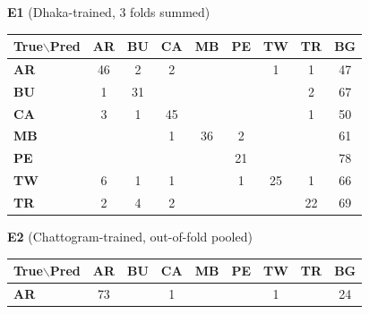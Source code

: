 \begin{table}[t]
\centering
\begin{minipage}{0.48\linewidth}
\centering
\scriptsize
\textbf{E1} (Dhaka-trained, 3 folds summed)\\[2pt]
\setlength{\tabcolsep}{2pt}
\renewcommand{\arraystretch}{1.15}
\begin{tabular}{|l|c|c|c|c|c|c|c|c|}
\hline
\textbf{True}$\backslash$\textbf{Pred} & \textbf{AR} & \textbf{BU} & \textbf{CA} & \textbf{MB} & \textbf{PE} & \textbf{TW} & \textbf{TR} & \textbf{BG} \\
\hline
\textbf{AR} & \cellcolor{blue!46}46 & \cellcolor{blue!2}2 & \cellcolor{blue!2}2 &  &  & \cellcolor{blue!1}1 & \cellcolor{blue!1}1 & \cellcolor{blue!47}47 \\
\hline
\textbf{BU} & \cellcolor{blue!1}1 & \cellcolor{blue!31}31 &  &  &  &  & \cellcolor{blue!2}2 & \cellcolor{blue!67}67 \\
\hline
\textbf{CA} & \cellcolor{blue!3}3 & \cellcolor{blue!1}1 & \cellcolor{blue!45}45 &  &  &  & \cellcolor{blue!1}1 & \cellcolor{blue!50}50 \\
\hline
\textbf{MB} &  &  & \cellcolor{blue!1}1 & \cellcolor{blue!36}36 & \cellcolor{blue!2}2 &  &  & \cellcolor{blue!61}61 \\
\hline
\textbf{PE} &  &  &  &  & \cellcolor{blue!21}21 &  &  & \cellcolor{blue!78}78 \\
\hline
\textbf{TW} & \cellcolor{blue!6}6 & \cellcolor{blue!1}1 & \cellcolor{blue!1}1 &  & \cellcolor{blue!1}1 & \cellcolor{blue!25}25 & \cellcolor{blue!1}1 & \cellcolor{blue!66}66 \\
\hline
\textbf{TR} & \cellcolor{blue!2}2 & \cellcolor{blue!4}4 & \cellcolor{blue!2}2 &  &  &  & \cellcolor{blue!22}22 & \cellcolor{blue!69}69 \\
\hline
\end{tabular}
\end{minipage}
\hfill
\begin{minipage}{0.48\linewidth}
\centering
\scriptsize
\textbf{E2} (Chattogram-trained, out-of-fold pooled)\\[2pt]
\setlength{\tabcolsep}{2pt}
\renewcommand{\arraystretch}{1.15}
\begin{tabular}{|l|c|c|c|c|c|c|c|c|}
\hline
\textbf{True}$\backslash$\textbf{Pred} & \textbf{AR} & \textbf{BU} & \textbf{CA} & \textbf{MB} & \textbf{PE} & \textbf{TW} & \textbf{TR} & \textbf{BG} \\
\hline
\textbf{AR} & \cellcolor{blue!73}73 &  & \cellcolor{blue!1}1 &  &  & \cellcolor{blue!1}1 &  & \cellcolor{blue!24}24 \\

\end{tabular}
\end{minipage}
\end{table}
